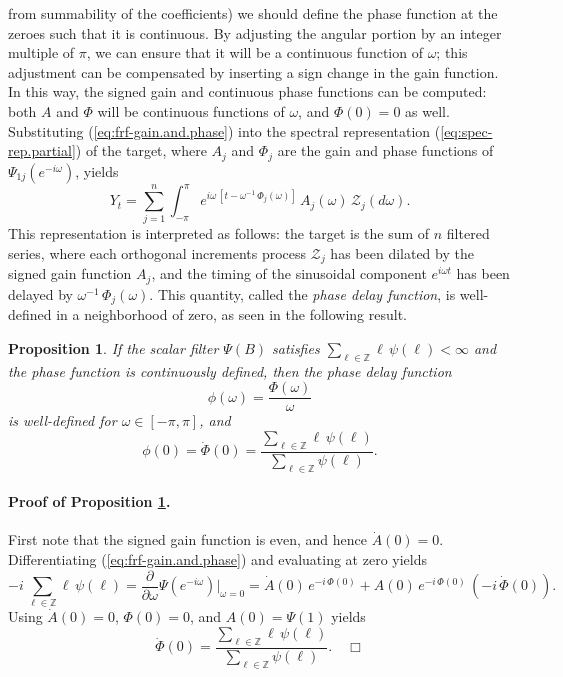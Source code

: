 \documentclass[a4paper]{book}
\def\ZZ{\mathbb Z}
\newtheorem{Proposition}{Proposition}
\begin{document}
 from summability of the coefficients) we should define the phase function at 
 the zeroes such that it is continuous.  By adjusting the angular portion by
 an integer multiple of $\pi$, we can ensure that it will be a continuous function of
 $\omega $; this adjustment can be compensated by inserting a sign change in the gain 
 function.  In this way, the signed gain and continuous phase functions can be
 computed: both $A$ and $\Phi$ will be continuous functions of $\omega $, and $\Phi (0) = 0$
 as well.    Substituting (\ref{eq:frf-gain.and.phase})
  into the spectral representation (\ref{eq:spec-rep.partial})
 of the target, where $A_j$ and $\Phi_j$ are the gain and phase functions of $\Psi_{1j} 
  (e^{-i \omega })$,  yields
\[
  Y_t = \sum_{j=1}^n  \int_{-\pi}^{\pi} e^{i \omega  \, [ t - \omega^{-1} \,
   \Phi_j (\omega )   ] } \,
  A_j ( \omega ) \,    \mathcal{Z}_j (d\omega ).
\]
 This representation is interpreted as follows: the target is the sum of $n$ filtered
 series, where each orthogonal increments process $\mathcal{Z}_j$ has been dilated
 by the signed gain function $A_j$, and the timing of the sinusoidal component 
 $e^{i \omega  t }$ has been delayed by $\omega ^{-1} \, \Phi_j (\omega )$.  
  This quantity, called the {\em phase delay function},
  is well-defined in a neighborhood of zero, as seen in the following
 result.

\begin{Proposition}
 \label{prop:phase-delay}
  If the scalar filter $\Psi (B)$ satisfies $\sum_{\ell \in \ZZ} \ell \, \psi (\ell) < \infty$
 and the phase function is continuously defined, then the phase delay function
\[
  \phi (\omega ) = \frac{\Phi (\omega ) }{ \omega }
\]
 is well-defined for $\omega  \in [-\pi, \pi]$, and 
\[
 \phi (0) = \dot{\Phi} (0) = \frac{ \sum_{\ell \in \ZZ} \ell \, \psi (\ell) }{ 
  \sum_{\ell \in \ZZ}   \psi (\ell) }.
\]
\end{Proposition}

\paragraph{Proof of Proposition \ref{prop:phase-delay}.}
 First note that the signed gain function is even, and hence $\dot{A} (0) = 0$.
 Differentiating (\ref{eq:frf-gain.and.phase}) and evaluating at zero yields
\[
  -i \, \sum_{\ell \in \ZZ} \ell \, \psi (\ell) = \frac{\partial}{\partial \omega }
  \Psi (e^{-i \omega }) \vert_{\omega = 0}
  = \dot{A} (0) \, e^{-i \, \Phi (0) } + A(0) \, e^{-i \, \Phi (0) } \,
  (-i \, \dot{\Phi} (0)).
\]
  Using $\dot{A} (0) = 0$, $\Phi (0) = 0$, and $A(0) = \Psi (1)$ yields
\[
 \dot{\Phi} (0) = \frac{ \sum_{\ell \in \ZZ} \ell \, \psi (\ell) }{ 
  \sum_{\ell \in \ZZ}   \psi (\ell) }.  \quad \Box
\]
\end{document}
